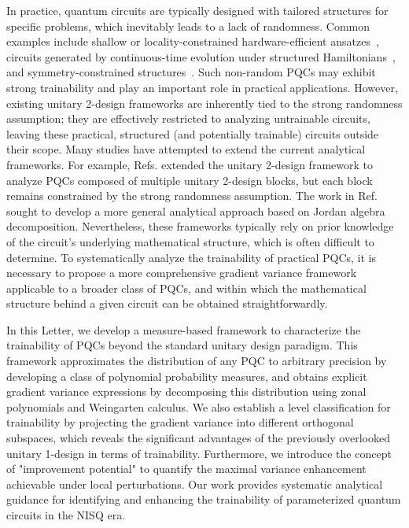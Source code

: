 \documentclass[%
 superscriptaddress,
 aps,prl,
 reprint,
 twocolumn,
 amsmath,amssymb,showpacs,
 bibnotes,
]{revtex4-2}
\begin{document}
In practice, quantum circuits are typically designed with tailored structures for specific problems, which inevitably leads to a lack of randomness. Common examples include shallow or locality-constrained hardware-efficient ansatzes~\cite{watanabe2023optimizing}, circuits generated by continuous-time evolution under structured Hamiltonians~\cite{park2024hamiltonian}, and symmetry-constrained structures~\cite{lee2018generalized}. Such non-random PQCs may exhibit strong trainability and play an important role in practical applications. However, existing unitary 2-design frameworks are inherently tied to the strong randomness assumption; they are effectively restricted to analyzing untrainable circuits, leaving these practical, structured (and potentially trainable) circuits outside their scope. Many studies have attempted to extend the current analytical frameworks. For example, Refs. \cite{brandao2016local,cerezo2021cost,pesah2021absence,ragone2024lie} extended the unitary 2-design framework to analyze PQCs composed of multiple unitary 2-design blocks, but each block remains constrained by the strong randomness assumption. The work in Ref.~\cite{anschuetz2024unified} sought to develop a more general analytical approach based on Jordan algebra decomposition. Nevertheless, these frameworks typically rely on prior knowledge of the circuit's underlying mathematical structure, which is often difficult to determine. To systematically analyze the trainability of practical PQCs, it is necessary to propose a more comprehensive gradient variance framework applicable to a broader class of PQCs, and within which the mathematical structure behind a given circuit can be obtained straightforwardly.

In this Letter, we develop a measure-based framework to characterize the trainability of PQCs beyond the standard unitary design paradigm. This framework approximates the distribution of any PQC to arbitrary precision by developing a class of polynomial probability measures, and obtains explicit gradient variance expressions by decomposing this distribution using zonal polynomials and Weingarten calculus. We also establish a level classification for trainability by projecting the gradient variance into different orthogonal subspaces, which reveals the significant advantages of the previously overlooked unitary 1-design in terms of trainability. Furthermore, we introduce the concept of "improvement potential" to quantify the maximal variance enhancement achievable under local perturbations. Our work provides systematic analytical guidance for identifying and enhancing the trainability of parameterized quantum circuits in the NISQ era.
\end{document}
